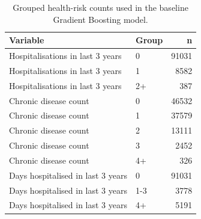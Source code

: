 \begin{table}
\caption{Grouped health-risk counts used in the baseline Gradient Boosting model.}
\label{tab:05-gb-group-counts}
\begin{tabular}{llr}
\toprule
Variable & Group & n \\
\midrule
Hospitalisations in last 3 years & 0 & 91031 \\
Hospitalisations in last 3 years & 1 & 8582 \\
Hospitalisations in last 3 years & 2+ & 387 \\
Chronic disease count & 0 & 46532 \\
Chronic disease count & 1 & 37579 \\
Chronic disease count & 2 & 13111 \\
Chronic disease count & 3 & 2452 \\
Chronic disease count & 4+ & 326 \\
Days hospitalised in last 3 years & 0 & 91031 \\
Days hospitalised in last 3 years & 1-3 & 3778 \\
Days hospitalised in last 3 years & 4+ & 5191 \\
\bottomrule
\end{tabular}
\end{table}
